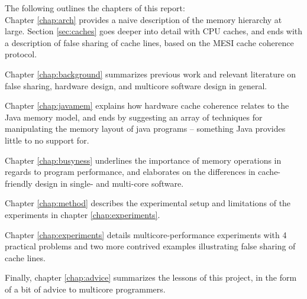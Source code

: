 The following outlines the chapters of this report:\\
Chapter \ref{chap:arch} provides a naive description of the memory hierarchy at
large. Section \ref{sec:caches} goes deeper into detail with CPU
caches, and ends with a description of false sharing of cache lines, based on
the MESI cache coherence protocol.

Chapter \ref{chap:background} summarizes previous work and relevant literature
on false sharing, hardware design, and multicore software design in general.

Chapter \ref{chap:javamem} explains how hardware cache coherence relates to the
Java memory model, and ends by suggesting an array of techniques for
manipulating the memory layout of java programs -- something Java provides
little to no support for.

Chapter \ref{chap:busyness} underlines the importance of memory operations in
regards to program performance, and elaborates on the differences in cache-friendly
design in single- and multi-core software.

Chapter \ref{chap:method} describes the experimental setup and limitations of the
experiments in chapter \ref{chap:experiments}.

Chapter \ref{chap:experiments} details multicore-performance experiments with 4
practical problems and two more contrived examples illustrating false sharing of
cache lines.

Finally, chapter \ref{chap:advice} summarizes the lessons of this project, in
the form of a bit of advice to multicore programmers.
